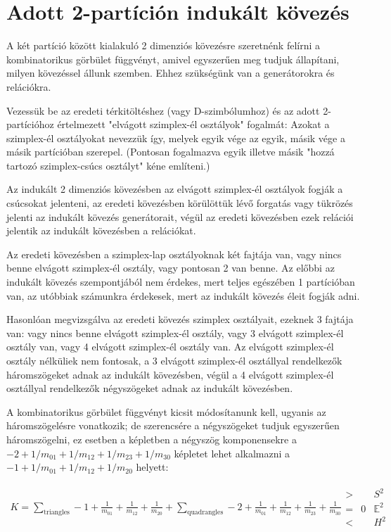 \documentclass[12pt,magyar,a4paper]{article}
\begin{document}
\section{Adott 2-partíción indukált kövezés}
A két partíció között kialakuló 2 dimenziós kövezésre szeretnénk felírni a
kombinatorikus görbület függvényt, amivel egyszerűen meg tudjuk állapítani,
milyen kövezéssel állunk szemben. Ehhez szükségünk van a generátorokra és
relációkra.

Vezessük be az eredeti térkitöltéshez (vagy D-szimbólumhoz) és az adott
2-partícióhoz értelmezett "elvágott szimplex-él osztályok" fogalmát: Azokat a
szimplex-él osztályokat nevezzük így, melyek egyik vége az egyik, másik vége a
másik partícióban szerepel. (Pontosan fogalmazva egyik illetve másik "hozzá
tartozó szimplex-csúcs osztályt" kéne említeni.)

Az indukált 2 dimenziós kövezésben az elvágott szimplex-él osztályok fogják a
csúcsokat jelenteni, az eredeti kövezésben körülöttük lévő forgatás vagy
tükrözés jelenti az indukált kövezés generátorait, végül az eredeti kövezésben
ezek relációi jelentik az indukált kövezésben a relációkat.

Az eredeti kövezésben a szimplex-lap osztályoknak két fajtája van, vagy nincs
benne elvágott szimplex-él osztály, vagy pontosan 2 van benne. Az előbbi az
indukált kövezés szempontjából nem érdekes, mert teljes egészében 1 partícióban
van, az utóbbiak számunkra érdekesek, mert az indukált kövezés éleit fogják
adni.

Hasonlóan megvizsgálva az eredeti kövezés szimplex osztályait, ezeknek 3 fajtája
van: vagy nincs benne elvágott szimplex-él osztály, vagy 3 elvágott szimplex-él
osztály van, vagy 4 elvágott szimplex-él osztály van. Az elvágott szimplex-él
osztály nélküliek nem fontosak, a 3 elvágott szimplex-él osztállyal rendelkezők
háromszögeket adnak az indukált kövezésben, végül a 4 elvágott szimplex-él
osztállyal rendelkezők négyszögeket adnak az indukált kövezésben.

A kombinatorikus görbület függvényt kicsit módosítanunk kell, ugyanis az
háromszögelésre vonatkozik; de szerencsére a négyszögeket tudjuk egyszerűen
háromszögelni, ez esetben a képletben a négyszög komponensekre a
$-2+1/m_{01}+1/m_{12}+1/m_{23}+1/m_{30}$ képletet lehet alkalmazni a
$-1+1/m_{01}+1/m_{12}+1/m_{20}$ helyett:

\begin{align*}
  K=\sum_{\mathrm{triangles}}-1+\frac{1}{m_{01}}+\frac{1}{m_{12}}+\frac{1}{m_{20}} + 
  \sum_{\mathrm{quadrangles}}-2+\frac{1}{m_{01}}+\frac{1}{m_{12}}+\frac{1}{m_{23}}+\frac{1}{m_{30}}
  \begin{array}{cccc}
    > & & S^2 \\
    = & 0 & \mathbb{E}^2 \\
    < & & H^2
  \end{array}
\end{align*}
\end{document}
